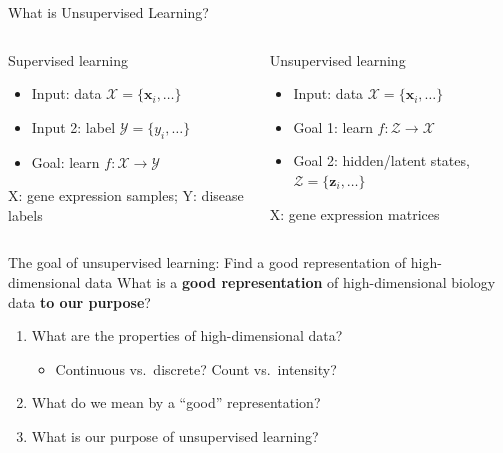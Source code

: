 \documentclass[
  ignorenonframetext,
  aspectratio=169]{beamer}
\providecommand{\tightlist}{%
  \setlength{\itemsep}{0pt}\setlength{\parskip}{0pt}}
\begin{document}
\begin{frame}{What is Unsupervised Learning?}
\protect\hypertarget{what-is-unsupervised-learning}{}
\begin{columns}[T]
\begin{column}{.45\textwidth}
\begin{block}{Supervised learning}
\protect\hypertarget{supervised-learning}{}
\begin{itemize}
\item
  Input: data \(\mathcal{X} = \{\mathbf{x}_{i},\ldots\}\)
\item
  Input 2: label \(\mathcal{Y} = \{y_{i},\ldots\}\)
\item
  Goal: learn \(f: \mathcal{X} \to \mathcal{Y}\)
\end{itemize}
\end{block}

X: gene expression samples; Y: disease labels
\end{column}

\begin{column}{.45\textwidth}
\begin{block}{Unsupervised learning}
\protect\hypertarget{unsupervised-learning}{}
\begin{itemize}
\item
  Input: data \(\mathcal{X} = \{\mathbf{x}_{i},\ldots\}\)
\item
  Goal 1: learn \(f: \mathcal{Z} \to \mathcal{X}\)
\item
  Goal 2: hidden/latent states,
  \(\mathcal{Z} = \{\mathbf{z}_{i},\ldots\}\)
\end{itemize}
\end{block}

X: gene expression matrices
\end{column}
\end{columns}
\end{frame}

\begin{frame}{The goal of unsupervised learning: Find a good
representation of high-dimensional data}
\protect\hypertarget{the-goal-of-unsupervised-learning-find-a-good-representation-of-high-dimensional-data}{}
What is a \textbf{good representation} of high-dimensional biology data
\textbf{to our purpose}?

\begin{enumerate}
\item
  What are the properties of high-dimensional data?

  \begin{itemize}
  \tightlist
  \item
    Continuous vs.~discrete? Count vs.~intensity?
  \end{itemize}
\item
  What do we mean by a ``good'' representation?
\item
  What is our purpose of unsupervised learning?
\end{enumerate}
\end{frame}
\end{document}
